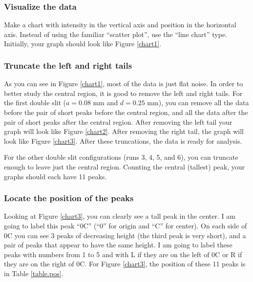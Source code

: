 \subsubsection{Visualize the data}
Make a chart with intensity in the vertical axis and position in the horizontal axis. Instead of using the familiar ``scatter plot'', use the ``line chart'' type. Initially, your graph should look like Figure \ref{chart1}.
\subsubsection{Truncate the left and right tails}
As you can see in Figure \ref{chart1}, most of the data is just flat noise. In order to better study the central region, it is good to remove the left and right tails. For the first double slit ($a = 0.08$ mm and $d = 0.25$ mm), you can remove all the data before the pair of short peaks before the central region, and all the data after the pair of short peaks after the central region. After removing the left tail your graph will look like Figure \ref{chart2}. After removing the right tail, the graph will look like Figure \ref{chart3}. After these truncations, the data is ready for analysis.

For the other double slit configurations (runs 3, 4, 5, and 6), you can truncate enough to leave just the central region. Counting the central (tallest) peak, your graphs should each have 11 peaks.
\subsubsection{Locate the position of the peaks}
Looking at Figure \ref{chart3}, you can clearly see a tall peak in the center. I am going to label this peak ``0C'' (``0'' for origin and ``C'' for center). On each side of 0C you can see 3 peaks of decreasing height (the third peak is very short), and a pair of peaks that appear to have the same height. I am going to label these peaks with numbers from 1 to 5 and with L if they are on the left of 0C or R if they are on the right of 0C. For Figure \ref{chart3}, the position of these 11 peaks is in Table \ref{table.pos}.
